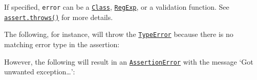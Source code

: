 If specified, \texttt{error} can be a
\href{https://developer.mozilla.org/en-US/docs/Web/JavaScript/Reference/Classes}{\texttt{Class}},
\href{https://developer.mozilla.org/en-US/docs/Web/JavaScript/Guide/Regular_Expressions}{\texttt{RegExp}},
or a validation function. See
\hyperref[assertthrowsfn-error-message]{\texttt{assert.throws()}} for
more details.

The following, for instance, will throw the
\href{errors.md\#class-typeerror}{\texttt{TypeError}} because there is
no matching error type in the assertion:

\begin{Shaded}
\begin{Highlighting}[]
 \OperatorTok{;}

\NormalTok{(}
\NormalTok{  () }\KeywordTok{=\textgreater{}}\NormalTok{ \{}
      \NormalTok{(}\NormalTok{)}\OperatorTok{;}
\NormalTok{  \}}\OperatorTok{,}
  \OperatorTok{,}
\NormalTok{)}\OperatorTok{;}
\end{Highlighting}
\end{Shaded}

\begin{Shaded}
\begin{Highlighting}[]
\OperatorTok{=} \NormalTok{(}\NormalTok{)}\OperatorTok{;}

\NormalTok{(}
\NormalTok{  () }\KeywordTok{=\textgreater{}}\NormalTok{ \{}
      \NormalTok{(}\NormalTok{)}\OperatorTok{;}
\NormalTok{  \}}\OperatorTok{,}
  \OperatorTok{,}
\NormalTok{)}\OperatorTok{;}
\end{Highlighting}
\end{Shaded}

However, the following will result in an
\hyperref[class-assertassertionerror]{\texttt{AssertionError}} with the
message `Got unwanted exception\ldots{}':

\begin{Shaded}
\begin{Highlighting}[]
 \OperatorTok{;}

\NormalTok{(}
\NormalTok{  () }\KeywordTok{=\textgreater{}}\NormalTok{ \{}
      \NormalTok{(}\NormalTok{)}\OperatorTok{;}
\NormalTok{  \}}\OperatorTok{,}
  \OperatorTok{,}
\NormalTok{)}\OperatorTok{;}
\end{Highlighting}
\end{Shaded}

